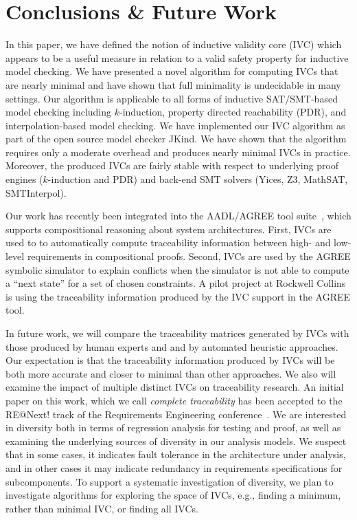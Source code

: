 \section{Conclusions \& Future Work}
\label{sec:conc}

In this paper, we have defined the notion of inductive validity core (IVC) which
appears to be a useful measure in relation to a valid safety property
for inductive model checking. We have presented a novel algorithm for
computing IVCs that are nearly minimal and have shown that full
minimality is undecidable in many settings. Our algorithm is
applicable to all forms of inductive SAT/SMT-based model checking
including $k$-induction, property directed reachability (PDR), and
interpolation-based model checking.
%
We have implemented our IVC algorithm as part of the open source model
checker JKind. We have shown that the algorithm requires only a
moderate overhead and produces nearly minimal IVCs in practice.
Moreover, the produced IVCs are fairly stable with respect to
underlying proof engines ($k$-induction and PDR) and back-end SMT
solvers (Yices, Z3, MathSAT, SMTInterpol).

Our work has recently been integrated into the AADL/AGREE tool
suite~\cite{QFCS15:backes,hilt2013}, which supports compositional 
reasoning about system architectures.  First, IVCs are used to
to automatically compute traceability information between high- and 
low-level requirements in compositional proofs. Second, IVCs are 
used by the AGREE symbolic simulator to explain conflicts when the 
simulator is not able to compute a ``next state'' for a set of chosen 
constraints.  A pilot project at Rockwell 
Collins is using the traceability information produced by the IVC 
support in the AGREE tool.  

In future work, we will compare the traceability matrices 
generated by IVCs with those produced by human experts and and by 
automated heuristic approaches.  Our expectation is that the traceability
information produced by IVCs will be both more accurate and closer to 
minimal than other approaches.
We also will examine the impact of multiple distinct IVCs on traceability 
research.  An initial paper on this work, which we call {\em complete traceability} 
has been accepted to the RE@Next! track of the Requirements Engineering 
conference~\cite{Murugesan16:renext}.  We are interested in diversity both 
in terms of regression analysis for testing and proof, as well as examining 
the underlying sources of diversity in our analysis models.  We suspect that 
in some cases, it indicates fault tolerance in the architecture under analysis, 
and in other cases it may indicate redundancy in requirements specifications 
for subcomponents.  To support a systematic investigation of diversity, we 
plan to investigate algorithms for exploring the space of IVCs, e.g., finding
a minimum, rather than minimal IVC, or finding all IVCs. 


